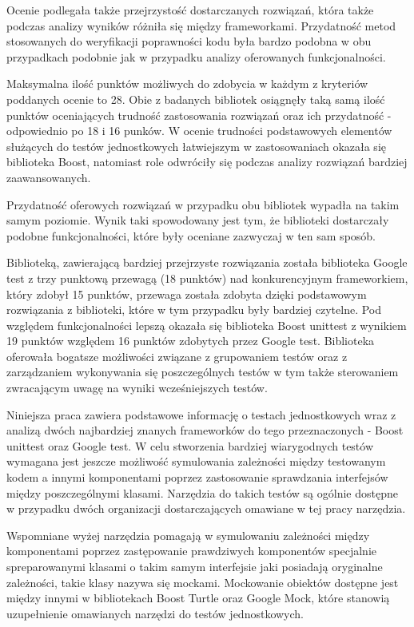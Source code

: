 \documentclass[12pt,a4paper,notitlepage]{report}
\begin{document}
	Ocenie podlegała także przejrzystość dostarczanych rozwiązań, która także podczas analizy wyników różniła się między frameworkami. Przydatność metod stosowanych do weryfikacji poprawności kodu była bardzo podobna w obu przypadkach podobnie jak w przypadku analizy oferowanych funkcjonalności.

	Maksymalna ilość punktów możliwych do zdobycia w każdym z kryteriów poddanych ocenie to 28. Obie z badanych bibliotek osiągnęły taką samą ilość punktów oceniających trudność zastosowania rozwiązań oraz ich przydatność - odpowiednio po 18 i 16 punków. W ocenie trudności podstawowych elementów służących do testów jednostkowych łatwiejszym w zastosowaniach okazała się biblioteka Boost, natomiast role odwróciły się podczas analizy rozwiązań bardziej zaawansowanych.

	Przydatność oferowych rozwiązań w przypadku obu bibliotek wypadła na takim samym poziomie. Wynik taki spowodowany jest tym, że biblioteki dostarczały podobne funkcjonalności, które były oceniane zazwyczaj w ten sam sposób.

	Biblioteką, zawierającą bardziej przejrzyste rozwiązania została biblioteka Google test z trzy punktową przewagą (18 punktów) nad konkurencyjnym frameworkiem, który zdobył 15 punktów, przewaga została zdobyta dzięki podstawowym rozwiązania z biblioteki, które w tym przypadku były bardziej czytelne. Pod względem funkcjonalności lepszą okazała się biblioteka Boost unittest z wynikiem 19 punktów względem 16 punktów zdobytych przez Google test. Biblioteka oferowała bogatsze możliwości związane z grupowaniem testów oraz z zarządzaniem wykonywania się poszczególnych testów w tym także sterowaniem zwracającym uwagę na wyniki wcześniejszych testów.

	Niniejsza praca zawiera podstawowe informację o testach jednostkowych wraz z analizą dwóch najbardziej znanych frameworków do tego przeznaczonych - Boost unittest oraz Google test. W celu stworzenia bardziej wiarygodnych testów wymagana jest jeszcze możliwość symulowania zależności między testowanym kodem a innymi komponentami poprzez zastosowanie sprawdzania interfejsów między poszczególnymi klasami. Narzędzia do takich testów są ogólnie dostępne w przypadku dwóch organizacji dostarczających omawiane w tej pracy narzędzia.

	Wspomniane wyżej narzędzia pomagają w symulowaniu zależności między komponentami poprzez zastępowanie prawdziwych komponentów specjalnie spreparowanymi klasami o takim samym interfejsie jaki posiadają oryginalne zależności, takie klasy nazywa się mockami. Mockowanie obiektów dostępne jest między innymi w bibliotekach Boost Turtle oraz Google Mock, które stanowią uzupełnienie omawianych narzędzi do testów jednostkowych.
\end{document}

